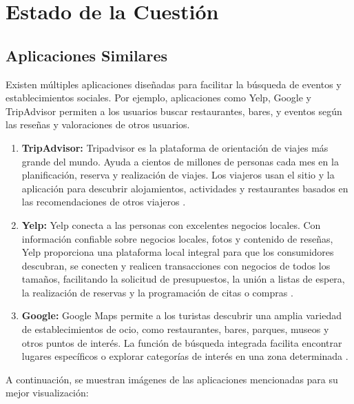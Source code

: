 \chapter{Estado de la Cuestión}
\section{Aplicaciones Similares}

Existen múltiples aplicaciones diseñadas para facilitar la búsqueda de eventos y establecimientos sociales. Por
ejemplo, aplicaciones como Yelp, Google y TripAdvisor permiten a los usuarios buscar restaurantes, bares, y eventos
según las reseñas y valoraciones de otros usuarios.

\begin{enumerate}
    \item \textbf{TripAdvisor:} Tripadvisor es la plataforma de orientación de viajes más grande del mundo. Ayuda a
          cientos de millones de personas cada mes en la planificación, reserva y realización de viajes. Los viajeros usan
          el sitio y la aplicación para descubrir alojamientos, actividades y restaurantes basados en las recomendaciones
          de otros viajeros \cite{tripadvisor}.

    \item \textbf{Yelp:} Yelp conecta a las personas con excelentes negocios locales. Con información confiable
          sobre negocios locales, fotos y contenido de reseñas, Yelp proporciona una plataforma local integral para que
          los consumidores descubran, se conecten y realicen transacciones con negocios de todos los tamaños, facilitando
          la solicitud de presupuestos, la unión a listas de espera, la realización de reservas y la programación de citas
          o compras \cite{yelp}.

    \item \textbf{Google:} Google Maps permite a los turistas descubrir una amplia variedad de establecimientos de
          ocio, como restaurantes, bares, parques, museos y otros puntos de interés. La función de búsqueda integrada
          facilita encontrar lugares específicos o explorar categorías de interés en una zona determinada \cite{google}.

\end{enumerate}

A continuación, se muestran imágenes de las aplicaciones mencionadas para su mejor visualización:

